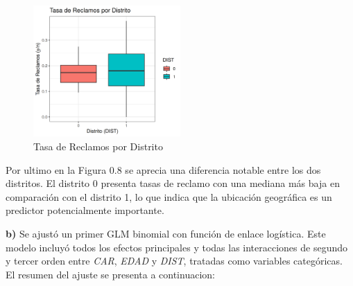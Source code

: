 \begin{figure}[H]
    \centering
    \includegraphics[width=0.5\textwidth]{images/rate_vs_dist.png}
    \caption{Tasa de Reclamos por Distrito}
    \label{fig:dist_boxplot}
\end{figure}

Por ultimo en la Figura 0.8 se aprecia una diferencia notable entre los dos distritos. El distrito 0 presenta tasas de reclamo con una mediana más baja en comparación con el distrito 1, lo que indica que la ubicación geográfica es un predictor potencialmente importante.

\newpage
\textbf{b)} Se ajustó un primer GLM binomial con función de enlace logística. Este modelo incluyó todos los efectos principales y todas las interacciones de segundo y tercer orden entre \textit{CAR}, \textit{EDAD} y \textit{DIST}, tratadas como variables categóricas. El resumen del ajuste se presenta a continuacion: 

